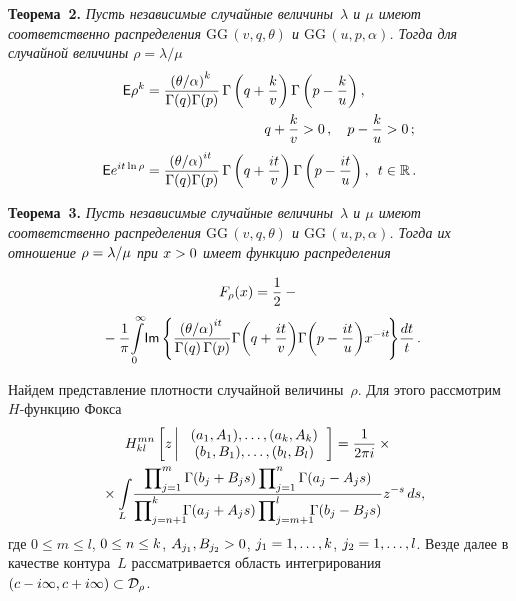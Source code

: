 \begin{multicols}{2}
\noindent
\textbf{Теорема~2.}
\textit{Пусть независимые случайные величины~$\lambda$ и $\mu$ имеют соответственно 
распределения $\mathrm{GG}\,(v,q,\theta)$ и $\mathrm{GG}\,(u,p,\alpha)$.
Тогда для случайной величины $\rho=\lambda/\mu$}
\begin{align*}
{\sf E} \rho^k &= \fr{\left(\theta/ \alpha\right)^{k}}{\Gamma(q)\Gamma(p)}\,
\Gamma\left(q+\fr{k}{v}\right)\Gamma\left(p-\fr{k}{u}\right), 
\\
&\hspace*{30mm}q+\fr{k}{v}>0\,, \quad p-\fr{k}{u}>0\,;
\\
{\sf E} e^{it\ln\rho}&= \fr{\left(\theta/ \alpha\right)^{it}}{\Gamma(q)\Gamma(p)}\,
\Gamma\left(q+\fr{it}{v}\right)\Gamma\left(p-\fr{it}{u}\right), \enskip  t\in\mathbb{R}\,.
\end{align*}


\smallskip

\noindent
\textbf{Теорема~3.}
\textit{Пусть независимые случайные величины~$\lambda$ и $\mu$ имеют соответственно распределения 
$\mathrm{GG}\,(v,q,\theta)$ и $\mathrm{GG}\,(u,p,\alpha)$. Тогда их отношение $\rho\hm=\lambda/\mu$ при $x\hm>0$ 
имеет функцию распределения}

\noindent
\begin{multline*}
F_{\rho}(x) = \fr{1}{2}-{}\\
{}-\fr{1}{\pi}\!\int\limits_0^{\infty}\!{\sf Im}\left\{
\fr{\left(\theta/ \alpha\right)^{it}}{\Gamma(q)\,\Gamma(p)}\Gamma\!\left(q+\fr{it}{v}\right)\!
\Gamma\!\left(p-\fr{it}{u}\right)\!x^{-it}\!\right\}\!\fr{dt}{t}\,.\hspace*{-3pt}
\end{multline*}


\smallskip

Найдем представление плотности случайной величины~$\rho$. Для этого рассмотрим $H$-функ\-цию 
Фокса~\cite{Prudnikov3}
\begin{multline*}
H_{kl}^{mn}
\left[z \left\vert \
\begin{array}{c}
(a_1,A_1),\ldots,(a_k,A_k)\\
(b_1,B_1),\ldots,(b_l,B_l)
\end{array}\right.
\right]=\fr{1}{2\pi i}\times{}\\
{}\times \int\limits_L  \! \fr{\prod\nolimits_{j=1}^m
\Gamma(b_j+B_js)\prod\nolimits_{j=1}^n\Gamma(a_j-A_js)}
{\prod\nolimits_{j=n+1}^k\!\!\!\Gamma(a_j+A_js)\prod\nolimits_{j=m+1}^l
\!\!\!\Gamma(b_j-B_js)}z^{-s}\,ds,\hspace*{-5.89261pt}
\end{multline*}
где $0\le m\le l$, $0\hm\le n\hm\le k$, $A_{j_1},B_{j_2}\hm>0$, $j_1\hm=1,\ldots,k$, 
$j_2\hm=1,\ldots,l$. Везде далее в качестве контура~$L$ рассматривается область интегрирования 
$\left(c-i\infty, c+i\infty\right)\hm\subset\mathcal{D}_\rho$.


\end{multicols}
